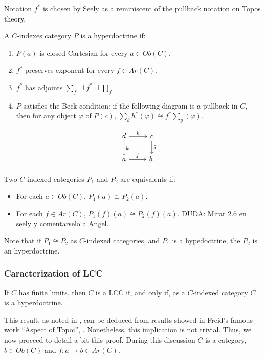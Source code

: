 Notation $f^*$ is chosen by Seely as a reminiscent of the pullback notation on Topos theory.


\begin{definition}
  A $C$-indexes category $P$ is a hyperdoctrine if:
  \begin{enumerate}
  \item $P(a)$ is closed Cartesian for every $a\in Ob(C)$.
  \item $f^*$ preserves exponent for every $f\in Ar(C)$.
  \item $f^*$ has adjoints $\sum_f \dashv f^* \dashv \prod_f$.
  \item $P$ satisfies the Beck condition: if the following diagram is a pullback in $C$, then for any object $\varphi$ of $P(c)$, $\sum_k h^*(\varphi) \cong f^*\sum_g(\varphi)$.
    \[
      \begin{tikzpicture}
        \node {\begin{tikzcd}
            d\ar[r,"h"]\ar[d,"k"] & c\ar[d,"g"]\\
            a\ar[r,"f"] & b.
          \end{tikzcd}};
      \end{tikzpicture}
    \]
  \end{enumerate}
\end{definition}
\begin{definition}
  Two $C$-indexed categories $P_1$ and $P_2$ are equivalents if:
  \begin{itemize}
  \item For each $a\in Ob(C)$, $P_1(a)\cong P_2(a)$.
  \item For each $f\in Ar(C)$, $P_1(f)(a)\cong P_2(f)(a)$.
    DUDA: Mirar 2.6 en seely y comentarselo a Angel.
  \end{itemize}
\end{definition}

Note that if $P_1\cong P_2$ as $C$-indexed categories, and $P_1$ is a hypedoctrine, the $P_2$ is an hyperdoctrine.


\subsubsection{Caracterization of LCC}
\begin{theorem}
  If $C$ has finite limits, then $C$ is a LCC if, and only if, as a $C$-indexed category $C$ is a hyperdoctrine. 
\end{theorem}

This result, as noted in \cites{seely1984locally}, can be deduced from results showed in Freid's famous work ``Aspect of Topoi'', \cite[Section 1.3]{freyd1972aspects}. Nonetheless, this implication is not trivial. Thus, we now proceed to detail a bit this proof. During this discussion $C$ is a category, $b\in Ob(C)$ and $f:a\to b\in Ar(C)$.


